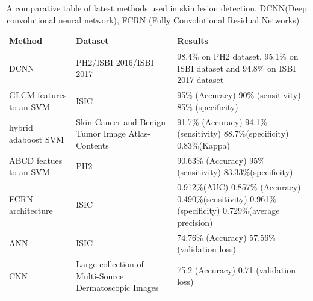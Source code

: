 \begin{table}[htbp]
    \begin{center}
        \begin{tabular}{p{3cm}|p{3cm}|p{6cm}}
        \hline 
        Method & Dataset & Results  \\ 
        \hline 
         DCNN & PH2/ISBI 2016/ISBI 2017 & 98.4\% on PH2 dataset, 95.1\% on ISBI dataset and 94.8\% on ISBI 2017 dataset \\ 
        \hline 
         GLCM features to an SVM & ISIC & 95\% (Accuracy) 90\% (sensitivity) 85\% (specificity) \\ 
        \hline 
            hybrid adaboost SVM  & Skin Cancer and Benign Tumor Image Atlas-Contents & 91.7\% (Accuracy) 94.1\%(sensitivity) 88.7\%(specificity) 0.83\%(Kappa) \\ 
        \hline 
            ABCD featues to an SVM & PH2 & 90.63\% (Accuracy) 95\% (sensitivity) 83.33\%(specificity) \\ 
        \hline 
         FCRN architecture & ISIC & 0.912\%(AUC) 0.857\% (Accuracy) 0.490\%(sensitivity) 0.961\%(specificity) 0.729\%(average precision) \\ 
        \hline 
         ANN & ISIC & 74.76\% (Accuracy) 57.56\% (validation loss) \\ 
        \hline 
         CNN & Large collection of Multi-Source Dermatoscopic Images & 75.2 (Accuracy) 0.71 (validation loss) \\ 
        \hline 
        \end{tabular} 
    \end{center}
\caption{A comparative table of latest methods used in skin lesion detection. DCNN(Deep convolutional neural network), FCRN (Fully Convolutional Residual Networks) ~\cite{Saba2020}}
\label{tab:first}
\end{table}






